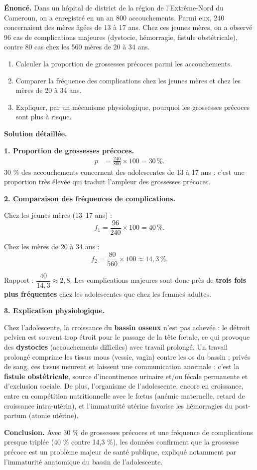 \documentclass[11pt]{article}
\begin{document}
\begin{exoresolu}
\textbf{Énoncé.} Dans un hôpital de district de la région de l'Extrême-Nord du Cameroun, on a enregistré en un an 800 accouchements. Parmi eux, 240 concernaient des mères âgées de 13 à 17 ans. Chez ces jeunes mères, on a observé 96 cas de complications majeures (dystocie, hémorragie, fistule obstétricale), contre 80 cas chez les 560 mères de 20 à 34 ans.
\begin{enumerate}
\item Calculer la proportion de grossesses précoces parmi les accouchements.
\item Comparer la fréquence des complications chez les jeunes mères et chez les mères de 20 à 34 ans.
\item Expliquer, par un mécanisme physiologique, pourquoi les grossesses précoces sont plus à risque.
\end{enumerate}
\tcblower
\textbf{Solution détaillée.}

\textbf{1. Proportion de grossesses précoces.}
\begin{align*}
p &= \frac{240}{800} \times 100 = 30\,\%.
\end{align*}
30 \% des accouchements concernent des adolescentes de 13 à 17 ans : c'est une proportion très élevée qui traduit l'ampleur des grossesses précoces.

\textbf{2. Comparaison des fréquences de complications.}

Chez les jeunes mères (13--17 ans) :
\[ f_1 = \frac{96}{240} \times 100 = 40\,\%. \]

Chez les mères de 20 à 34 ans :
\[ f_2 = \frac{80}{560} \times 100 \approx 14,3\,\%. \]

Rapport : $\dfrac{40}{14,3} \approx 2,8$. Les complications majeures sont donc près de \textbf{trois fois plus fréquentes} chez les adolescentes que chez les femmes adultes.

\textbf{3. Explication physiologique.}

Chez l'adolescente, la croissance du \textbf{bassin osseux} n'est pas achevée : le détroit pelvien est souvent trop étroit pour le passage de la tête fœtale, ce qui provoque des \textbf{dystocies} (accouchements difficiles) avec travail prolongé. Un travail prolongé comprime les tissus mous (vessie, vagin) contre les os du bassin ; privés de sang, ces tissus meurent et laissent une communication anormale : c'est la \textbf{fistule obstétricale}, source d'incontinence urinaire et/ou fécale permanente et d'exclusion sociale. De plus, l'organisme de l'adolescente, encore en croissance, entre en compétition nutritionnelle avec le fœtus (anémie maternelle, retard de croissance intra-utérin), et l'immaturité utérine favorise les hémorragies du post-partum (atonie utérine).

\textbf{Conclusion.} Avec 30 \% de grossesses précoces et une fréquence de complications presque triplée (40 \% contre 14,3 \%), les données confirment que la grossesse précoce est un problème majeur de santé publique, expliqué notamment par l'immaturité anatomique du bassin de l'adolescente.
\end{exoresolu}
\end{document}
